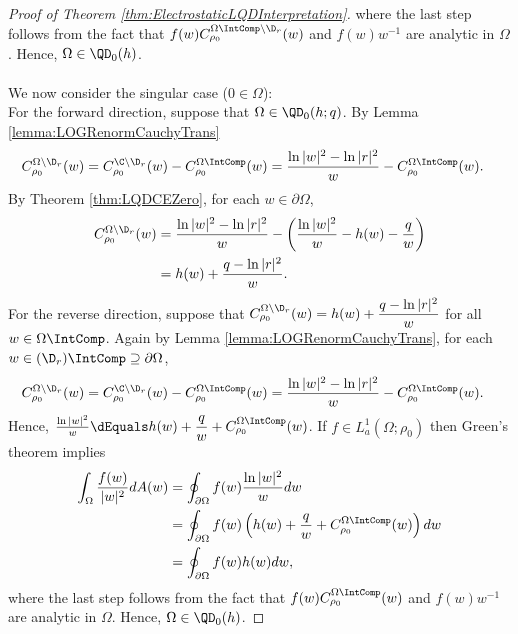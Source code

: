 \documentclass{article}
\numberwithin{equation}{section}
\begin{document}
\begin{proof}[Proof of Theorem \ref{thm:ElectrostaticLQDInterpretation}]
where the last step follows from the fact that $f(w)C_{\rho_0}^{\Omega\IntComp\setminus\D_r}(w)$ and $f(w)w^{-1}$ are analytic in $\Omega$. Hence, $\Omega\in\QD_0(h)$.\\\\
We now consider the singular case ($0\in\Omega$):\\
For the forward direction, suppose that $\Omega\in\QD_0(h;q)$. By Lemma \ref{lemma:LOGRenormCauchyTrans}
\begin{align*}
    C_{\rho_0}^{\Omega\setminus\D_r}(w)&=C_{\rho_0}^{\C\setminus\D_r}(w)-C_{\rho_0}^{\Omega\IntComp}(w)=\dfrac{\ln|w|^2-\ln|r|^2}{w}-C_{\rho_0}^{\Omega\IntComp}(w).
\end{align*}
By Theorem \ref{thm:LQDCEZero}, for each $w\in\partial\Omega$,
\begin{align*}
    C_{\rho_0}^{\Omega\setminus\D_r}(w)&=\dfrac{\ln|w|^2-\ln|r|^2}{w}-\left(\dfrac{\ln|w|^2}{w}-h(w)-\frac{q}{w}\right)\\
    &=h(w)+\dfrac{q-\ln|r|^2}{w}.
\end{align*}
For the reverse direction, suppose that $C_{\rho_0}^{\Omega\setminus\D_r}(w)=h(w)+\dfrac{q-\ln|r|^2}{w}$ for all $w\in\Omega\IntComp$. Again by Lemma \ref{lemma:LOGRenormCauchyTrans}, for each $w\in(\D_{r})\IntComp\supseteq\partial\Omega$,
\begin{align*}
    C_{\rho_0}^{\Omega\setminus\D_r}(w)&=C_{\rho_0}^{\C\setminus\D_r}(w)-C_{\rho_0}^{\Omega\IntComp}(w)=\dfrac{\ln|w|^2-\ln|r|^2}{w}-C_{\rho_0}^{\Omega\IntComp}(w).
\end{align*}
Hence, $\frac{\ln|w|^2}{w}\dEquals h(w)+\dfrac{q}{w}+C_{\rho_0}^{\Omega\IntComp}(w)$. If $f\in L_a^1(\Omega;\rho_0)$ then Green's theorem implies
\begin{align*}
    \int_{\Omega}\dfrac{f(w)}{|w|^2}dA(w)&=\oint_{\partial\Omega}f(w)\dfrac{\ln|w|^2}{w}dw\\
    &=\oint_{\partial\Omega}f(w)\left(h(w)+\dfrac{q}{w}+C_{\rho_0}^{\Omega\IntComp}(w)\right)dw\\
    &=\oint_{\partial\Omega}f(w)h(w)dw,
\end{align*}
where the last step follows from the fact that  $f(w)C_{\rho_0}^{\Omega\IntComp}(w)$ and $f(w)w^{-1}$ are analytic in $\Omega$. Hence, $\Omega\in\QD_0(h)$.
\end{proof}
\end{document}
